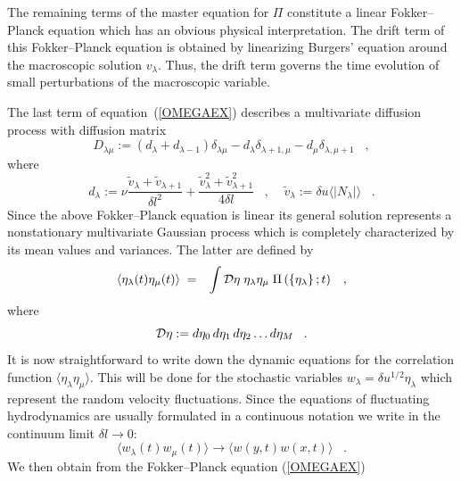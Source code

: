 The remaining terms of the
master equation for $\Pi$ constitute a linear Fokker--Planck equation
which has
an obvious physical interpretation. The drift term of this Fokker--Planck
equation is
obtained by linearizing Burgers' equation around the
macroscopic solution $v_{\lambda}$. Thus, the drift term governs
the time evolution of small perturbations of the macroscopic variable.

The last term of equation~(\ref{OMEGAEX}) describes a multivariate
diffusion process with diffusion matrix
\begin{equation}     \label{DIFFMAT}
D_{\lambda \mu} :=\left( d_{\lambda} + d_{\lambda -1}  \right)
\delta_{\lambda
\mu} - d_{\lambda} \delta_{\lambda +1, \mu} - d_{\mu} \delta_{\lambda , \mu +1}
\;\;\; ,
\end{equation}
where
\begin{equation}
d_{\lambda} := \nu \frac{{\tilde{v}}_{\lambda} +
{\tilde{v}}_{\lambda + 1}}{\delta l^2}
 + \frac{{\tilde{v}}_{\lambda}^2 + {\tilde{v}}_{\lambda + 1}^2}{4 \delta l}
\;\;\; , \;\;\;\; {\tilde{v}}_{\lambda}:= \delta u
      \langle \mid N_{\lambda} \mid \rangle \;\;\; .
\end{equation}
Since the above Fokker--Planck equation is linear its general solution
represents a nonstationary multivariate
Gaussian process which is completely characterized
by its mean values and variances.
The latter are defined by
\begin{eqnarray}
\langle \eta_{\lambda}(t) \eta_{\mu}(t) \rangle \; &=& \int {\cal{D}} \eta \;
\eta_{\lambda} \eta_{\mu} \;
\Pi \left( \left\{ \eta_{\lambda} \right\};t \right)
        \;\;\; ,
\end{eqnarray}
where
\begin{equation}
{\cal{D}}\eta := d\eta_0 \, d\eta_1 \, d\eta_2 \ldots d\eta_M
\;\;\; .
\end{equation}
It is now straightforward to write down the
dynamic equations for the correlation function
$\langle \eta_{\lambda} \eta_{\mu} \rangle $.
This will be done for the stochastic variables
$w_{\lambda} = \delta u^{1/2}\eta_{\lambda}$
which represent the random velocity fluctuations. Since the equations
of fluctuating hydrodynamics are usually formulated in a continuous
notation we write in the continuum limit
$\delta l \longrightarrow 0$:
\begin{equation}
\langle w_{\lambda}(t) w_{\mu}(t) \rangle \longrightarrow
\langle w(y,t) w(x,t) \rangle   \;\;\; .
\end{equation}
We then obtain from the Fokker--Planck equation (\ref{OMEGAEX})
